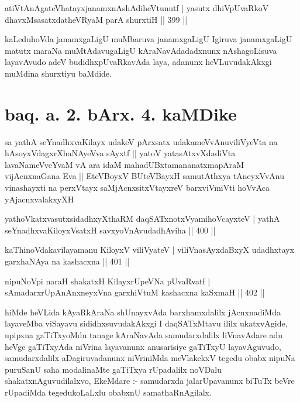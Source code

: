 
\begin{shl}
atiVtAnAgateVhatayxjanamxnAshAdiheVtunutf |
yasutx dhiVpUvaRkoV dhavxMsasatxdatheVRyaM parA shurxtiH \hfill || 399 ||
\end{shl}

\begin{artha}
kaLeduhoVda janamxgaLigU muMbaruva janamxgaLigU Igiruva janamxgaLigU matutx maraNa muMtAdavugaLigU kAraNavAdadadxnunx nAshagoLisuva layavAvudo adeV budidhxpUvaRkavAda laya, adanunx heVLuvudakAkxgi muMdina shurxtiyu baMdide.
\end{artha}

\section*{baq. a. 2. bArx. 4. kaMDike}

\begin{shl}
sa yathA seYnadhxvaKilayx udakeV pArxsatx udakameVvAnuviliVyeVta na hAsoyxVdagxrXhaNAyeVva sAyxtf || yatoV yatasAtxvXdadiVta lavaNameVveYvaM vA ara idaM mahadUBxtamananatxmapAraM vijAcnxnaGana Eva || EteVBoyxV BUteVBayxH samutAthxya tAneyxVvAnu vinashayxti na perxVtayx saMjAcnxsitxVtayxreV barxviVmiVti hoVvAca yAjacnxvalakxyXH 
\end{shl}

\begin{shl}
yathoVkatxvasutxsidadhxyXthaRM daqSATxnotxV\s yamihoVcayxteV |
yathA seYnadhxvaKiloyxV\s satxH savxyoVnAvudadhAviha \hfill || 400 ||
\end{shl}

\begin{shl}
kaThinoVdakavilayamanu KiloyxV viliVyateV |
viliVnasAyxdaBxyX udadhxtayx garxhaNAya na kashacxna \hfill || 401 ||
\end{shl}

\begin{shl}
nipuNoV\s pi naraH shakatxH KilayxrUpeVNa pUvaRvatf |
sAmadarxrUpAnAnxneyxVna garxhiVtuM kashacxna kaSxmaH \hfill || 402 ||
\end{shl}

\begin{artha}
hiMde heVLida kAyaRkAraNa shUnayxvAda barxhamxdalilx jAcnxnadiMda layaveMba viSayavu sididhxsuvudakAkxgi I daqSATxMtavu ililx ukatxvAgide, upipxna gaTiTx\-yoMdu tanage kAraNavAda samudarxdalilx liVnavAdare adu heVge gaTiTxyAda niVrina layavanunx anusarisiye gaTiTxyU layavAguvudo, samudarxdalilx aDagiruvadanunx niVriniMda meVlakekxV tegedu obabx nipuNa puruSanU saha modalinaMte gaTiTxya rUpadalilx noVDalu shakatxnAguvudilalxvo, EkeMdare :- samudarxda jalarUpavanunx biTuTx beVre rUpadiMda tegedukoLaLxlu obabxnU samathaRnAgilalx.
\end{artha}

